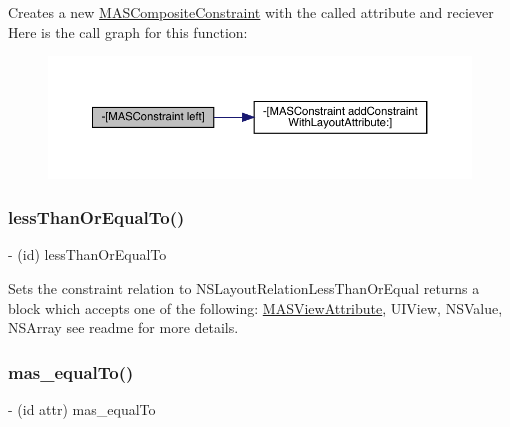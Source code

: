Creates a new \mbox{\hyperlink{interface_m_a_s_composite_constraint}{M\+A\+S\+Composite\+Constraint}} with the called attribute and reciever Here is the call graph for this function\+:\nopagebreak
\begin{figure}[H]
\begin{center}
\leavevmode
\includegraphics[width=350pt]{interface_m_a_s_constraint_a64aa053120a64954e251f9b7d1f5d34a_cgraph}
\end{center}
\end{figure}
\mbox{\label{interface_m_a_s_constraint_a221ca2c83aeeaa4b2eac455f41d67260}} 
\subsubsection{\texorpdfstring{less\+Than\+Or\+Equal\+To()}{lessThanOrEqualTo()}}
{\footnotesize\ttfamily -\/ (id) less\+Than\+Or\+Equal\+To \begin{DoxyParamCaption}{ }\end{DoxyParamCaption}}

Sets the constraint relation to N\+S\+Layout\+Relation\+Less\+Than\+Or\+Equal returns a block which accepts one of the following\+: \mbox{\hyperlink{interface_m_a_s_view_attribute}{M\+A\+S\+View\+Attribute}}, U\+I\+View, N\+S\+Value, N\+S\+Array see readme for more details. \mbox{\label{interface_m_a_s_constraint_a3a362a9fa62f0adae01eb60b6a8508d1}} 
\subsubsection{\texorpdfstring{mas\+\_\+equal\+To()}{mas\_equalTo()}}
{\footnotesize\ttfamily -\/ (id attr) mas\+\_\+equal\+To \begin{DoxyParamCaption}{ }\end{DoxyParamCaption}}

